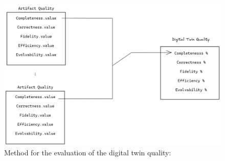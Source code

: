\documentclass{llncs}
\begin{document}
    \begin{figure}[htbp]
        \includegraphics[scale = 0.25]{DigitalTwinQuality.png}
            \caption{Method for the evaluation of the digital twin quality:}
        \label{fig:MethodforDigitalTwinQuality}
    \end{figure}
   
    
\end{document}
